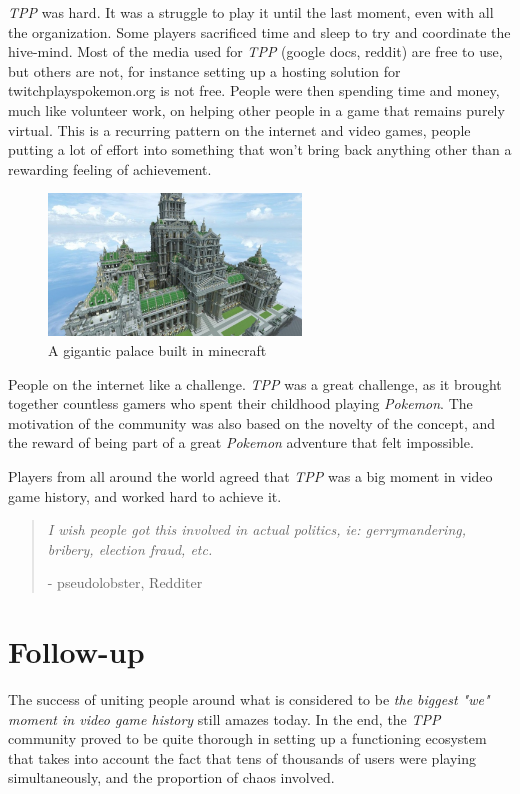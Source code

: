 \documentclass[a4paper]{article}
\begin{document}
\textit{TPP} was hard. It was a struggle to play it until the last moment, even with all the organization. Some players sacrificed time and sleep to try and coordinate the hive-mind. Most of the media used for \textit{TPP} (google docs, reddit) are free to use, but others are not, for instance setting up a hosting solution for twitchplayspokemon.org is not free. People were then spending time and money, much like volunteer work, on helping other people in a game that remains purely virtual. This is a recurring pattern on the internet and video games, people putting a lot of effort into something that won't bring back anything other than a rewarding feeling of achievement.

\begin{figure}[h]
\includegraphics[width=0.6\textwidth,center]{pictures/Minecraft.jpg}
\caption{A gigantic palace built in minecraft}
\end{figure}

People on the internet like a challenge. \textit{TPP} was a great challenge, as it brought together countless gamers who spent their childhood playing \textit{Pokemon}. The motivation of the community was also based on the novelty of the concept, and the reward of being part of a great \textit{Pokemon} adventure that felt impossible.

Players from all around the world agreed that \textit{TPP} was a big moment in video game history, and worked hard to achieve it.
\begin{quote}
\textit{
I wish people got this involved in actual politics, ie: gerrymandering, bribery, election fraud, etc.
}\par
\hfill\hfill- pseudolobster, Redditer
\end{quote}

\newpage

\section{Follow-up}

The success of uniting people around what is considered to be \textit{the biggest "we" moment in video game history} still amazes today.
In the end, the \textit{TPP} community proved to be quite thorough in setting up a functioning ecosystem that takes into account the fact that tens of thousands of users were playing simultaneously, and the proportion of chaos involved.
\end{document}
